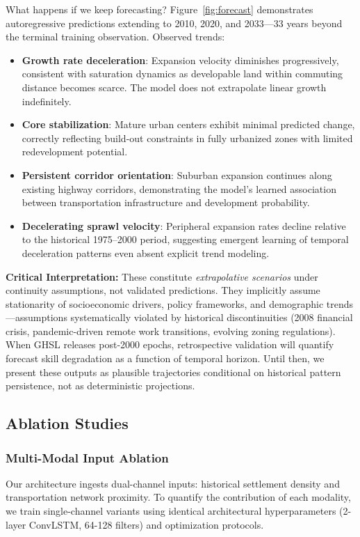 \documentclass[conference]{IEEEtran}
\begin{document}
What happens if we keep forecasting? Figure~\ref{fig:forecast} demonstrates autoregressive predictions extending to 2010, 2020, and 2033---33 years beyond the terminal training observation. Observed trends:
\begin{itemize}
    \item \textbf{Growth rate deceleration}: Expansion velocity diminishes progressively, consistent with saturation dynamics as developable land within commuting distance becomes scarce. The model does not extrapolate linear growth indefinitely.
    \item \textbf{Core stabilization}: Mature urban centers exhibit minimal predicted change, correctly reflecting build-out constraints in fully urbanized zones with limited redevelopment potential.
    \item \textbf{Persistent corridor orientation}: Suburban expansion continues along existing highway corridors, demonstrating the model's learned association between transportation infrastructure and development probability.
    \item \textbf{Decelerating sprawl velocity}: Peripheral expansion rates decline relative to the historical 1975--2000 period, suggesting emergent learning of temporal deceleration patterns even absent explicit trend modeling.
\end{itemize}

\textbf{Critical Interpretation:} These constitute \textit{extrapolative scenarios} under continuity assumptions, not validated predictions. They implicitly assume stationarity of socioeconomic drivers, policy frameworks, and demographic trends---assumptions systematically violated by historical discontinuities (2008 financial crisis, pandemic-driven remote work transitions, evolving zoning regulations). When GHSL releases post-2000 epochs, retrospective validation will quantify forecast skill degradation as a function of temporal horizon. Until then, we present these outputs as plausible trajectories conditional on historical pattern persistence, not as deterministic projections.

\subsection{Ablation Studies}

\subsubsection{Multi-Modal Input Ablation}
Our architecture ingests dual-channel inputs: historical settlement density and transportation network proximity. To quantify the contribution of each modality, we train single-channel variants using identical architectural hyperparameters (2-layer ConvLSTM, 64-128 filters) and optimization protocols.
\end{document}

